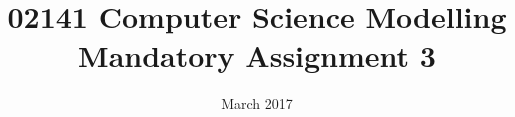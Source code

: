 

\title{02141 Computer Science Modelling\\Mandatory Assignment 3}
\date{March 2017}
\author{ }


\maketitle

















